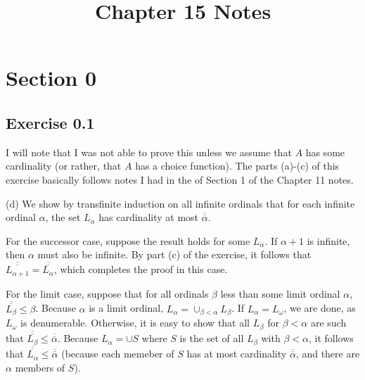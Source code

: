\documentclass{article}
\title{Chapter 15 Notes}
\theoremstyle{definition}
\begin{document}
\date{}
\maketitle

\section*{Section 0}

\subsection*{Exercise 0.1}
I will note that I was not able to prove this unless we assume that $A$ has some cardinality (or rather, that $A$ has a choice function). The 
parts (a)-(c) of this exercise basically follows notes I had in the  of Section 1 of the Chapter 11 notes.

(d) We show by transfinite induction on all infinite ordinals that for each infinite ordinal $\alpha$, the set $L_\alpha$ has 
cardinality at most $\overline{\overline{\alpha}}$.

For the successor case, suppose the result holds for some $L_\alpha$. If $\alpha+1$ is infinite, then $\alpha$ must also be infinite. By part (c) 
of the exercise, it follows that $\overline{\overline{L_{\alpha+1}}}=\overline{\overline{L_\alpha}}$, which completes the proof in this case.

For the limit case, suppose that for all ordinals $\beta$ less than some limit ordinal $\alpha$, $\overline{\overline{L_\beta}}\le\beta$.
Because $\alpha$ is a limit ordinal, $L_\alpha=\cup_{\beta<\alpha}L_\beta$. If $L_\alpha=L_\omega$, we are done, as $L_\omega$ is denumerable.
Otherwise, it is easy to show that all $L_\beta$ for $\beta<\alpha$ are such that $\overline{\overline{L_\beta}}\le\overline{\overline{\alpha}}$.
Because $L_\alpha=\cup S$ where $S$ is the set of all $L_\beta$ with $\beta<\alpha$, it follows that $\overline{\overline{L_\alpha}}\le\overline{\overline{\alpha}}$ 
(because each memeber of $S$ has at most cardinality $\overline{\overline{\alpha}}$, and there are $\alpha$ members of $S$).
\end{document}
